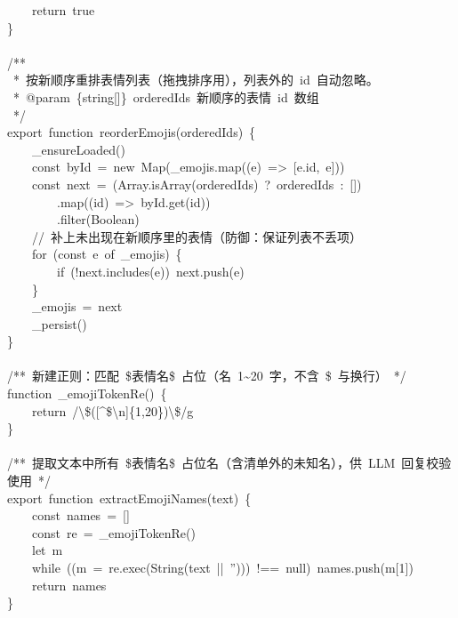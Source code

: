 \documentclass[a4paper,10pt]{article}
\begin{document}
{\ttfamily\footnotesize\raggedright
~~~~return~true\\
\}\\
\mbox{}\\
/**\\
~*~按新顺序重排表情列表（拖拽排序用），列表外的~id~自动忽略。\\
~*~@param~\{string[]\}~orderedIds~新顺序的表情~id~数组\\
~*/\\
export~function~reorderEmojis(orderedIds)~\{\\
~~~~\_ensureLoaded()\\
~~~~const~byId~=~new~Map(\_emojis.map((e)~=>~[e.id,~e]))\\
~~~~const~next~=~(Array.isArray(orderedIds)~?~orderedIds~:~[])\\
~~~~~~~~.map((id)~=>~byId.get(id))\\
~~~~~~~~.filter(Boolean)\\
~~~~//~补上未出现在新顺序里的表情（防御：保证列表不丢项）\\
~~~~for~(const~e~of~\_emojis)~\{\\
~~~~~~~~if~(!next.includes(e))~next.push(e)\\
~~~~\}\\
~~~~\_emojis~=~next\\
~~~~\_persist()\\
\}\\
\mbox{}\\
/**~新建正则：匹配~\$表情名\$~占位（名~1\textasciitilde{}20~字，不含~\$~与换行）~*/\\
function~\_emojiTokenRe()~\{\\
~~~~return~/\textbackslash{}\$([\textasciicircum{}\$\textbackslash{}n]\{1,20\})\textbackslash{}\$/g\\
\}\\
\mbox{}\\
/**~提取文本中所有~\$表情名\$~占位名（含清单外的未知名），供~LLM~回复校验使用~*/\\
export~function~extractEmojiNames(text)~\{\\
~~~~const~names~=~[]\\
~~~~const~re~=~\_emojiTokenRe()\\
~~~~let~m\\
~~~~while~((m~=~re.exec(String(text~||~'')))~!==~null)~names.push(m[1])\\
~~~~return~names\\
\}\\
\mbox{}\\
}
\end{document}
